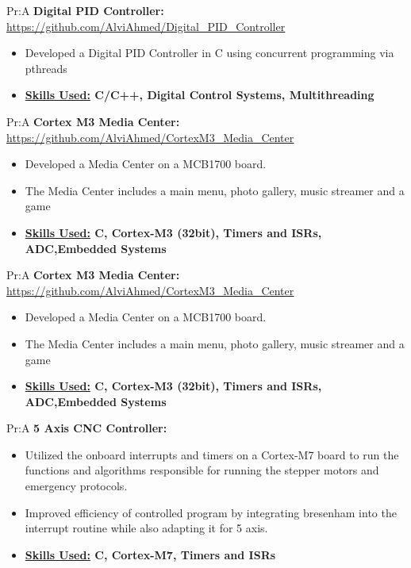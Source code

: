  
Pr:A
\vspace{\spaces}
\textbf{Digital PID Controller: }
\underline{\url{https://github.com/AlviAhmed/Digital_PID_Controller}}
\begin{itemize}[noitemsep,nolistsep]
\item Developed a Digital PID Controller in C using concurrent programming via pthreads
\item \textbf{ \underline{Skills Used:} C/C++, Digital Control Systems, Multithreading}
\end{itemize} 

 
Pr:A
\vspace{\spaces}
\textbf{Cortex M3 Media Center: } 
\underline{\url{https://github.com/AlviAhmed/CortexM3_Media_Center}}
\begin{itemize}[noitemsep,nolistsep]
\item Developed a Media Center on a MCB1700 board.
\item The Media Center includes a main menu, photo gallery, music streamer and a game 
\item \textbf{ \underline{Skills Used:} C, Cortex-M3 (32bit), Timers and ISRs, ADC,Embedded Systems}
\end{itemize} 

 
Pr:A
\vspace{\spaces}
\textbf{Cortex M3 Media Center: } 
\underline{\url{https://github.com/AlviAhmed/CortexM3_Media_Center}}
\begin{itemize}[noitemsep,nolistsep]
\item Developed a Media Center on a MCB1700 board.
\item The Media Center includes a main menu, photo gallery, music streamer and a game 
\item \textbf{ \underline{Skills Used:} C, Cortex-M3 (32bit), Timers and ISRs, ADC,Embedded Systems}
\end{itemize} 

   
Pr:A
\vspace{\spaces}
\textbf{5 Axis CNC Controller: } 
\begin{itemize}[noitemsep,nolistsep]
\item Utilized the onboard interrupts and timers on a Cortex-M7 board to run the functions and algorithms responsible for running the stepper motors and emergency protocols.
\item Improved efficiency of controlled program by integrating bresenham into the interrupt routine while also adapting it for 5 axis.
\item \textbf{ \underline{Skills Used:} C, Cortex-M7, Timers and ISRs}
\end{itemize} 


